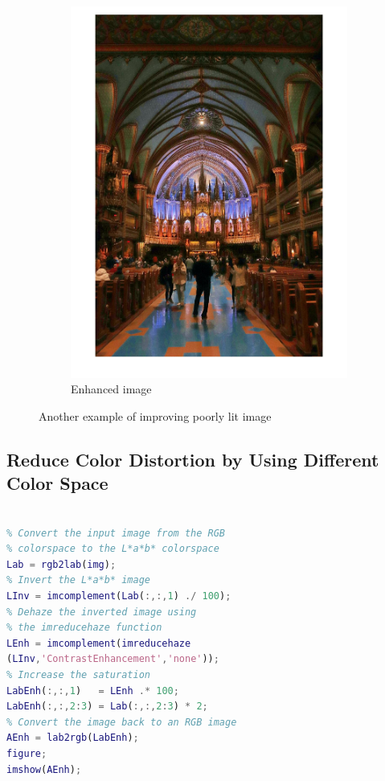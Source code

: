 \documentclass[conference]{IEEEtran}
\begin{document}
\begin{figure}[h!]
\begin{subfigure}[b]{0.4\linewidth}
\includegraphics[width=\linewidth]{images/img28.jpg}
\caption{Enhanced image}
\end{subfigure}
\caption{Another example of improving poorly lit image}
\label{fig:example}
\end{figure}

\subsection{Reduce Color Distortion by Using Different Color Space}

\begin{lstlisting}[language=Matlab]

% Convert the input image from the RGB 
% colorspace to the L*a*b* colorspace
Lab = rgb2lab(img);
% Invert the L*a*b* image
LInv = imcomplement(Lab(:,:,1) ./ 100);
% Dehaze the inverted image using 
% the imreducehaze function
LEnh = imcomplement(imreducehaze
(LInv,'ContrastEnhancement','none'));
% Increase the saturation
LabEnh(:,:,1)   = LEnh .* 100;
LabEnh(:,:,2:3) = Lab(:,:,2:3) * 2; 
% Convert the image back to an RGB image
AEnh = lab2rgb(LabEnh);
figure;
imshow(AEnh);

\end{lstlisting}
\end{document}
